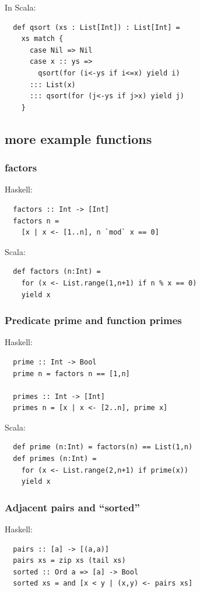 \documentclass[tikz,border=10pt]{project_plan}
\begin{document}
In Scala:
\begin{lstlisting}
  def qsort (xs : List[Int]) : List[Int] =
    xs match {
      case Nil => Nil
      case x :: ys =>
        qsort(for (i<-ys if i<=x) yield i)
      ::: List(x)
      ::: qsort(for (j<-ys if j>x) yield j)
    }
\end{lstlisting}

\subsection{more example functions}

\subsubsection{factors}

Haskell:
\begin{lstlisting}
  factors :: Int -> [Int]
  factors n =
    [x | x <- [1..n], n `mod` x == 0]
\end{lstlisting}
Scala:
\begin{lstlisting}
  def factors (n:Int) =
    for (x <- List.range(1,n+1) if n % x == 0)
    yield x
\end{lstlisting}

\subsubsection{Predicate prime and function primes}

Haskell:
\begin{lstlisting}
  prime :: Int -> Bool
  prime n = factors n == [1,n]

  primes :: Int -> [Int]
  primes n = [x | x <- [2..n], prime x]
\end{lstlisting}
Scala:
\begin{lstlisting}
  def prime (n:Int) = factors(n) == List(1,n)
  def primes (n:Int) =
    for (x <- List.range(2,n+1) if prime(x))
    yield x
\end{lstlisting}

\subsubsection{Adjacent pairs and “sorted”}
Haskell:
\begin{lstlisting}
  pairs :: [a] -> [(a,a)]
  pairs xs = zip xs (tail xs)
  sorted :: Ord a => [a] -> Bool
  sorted xs = and [x < y | (x,y) <- pairs xs]
\end{lstlisting}
\end{document}
